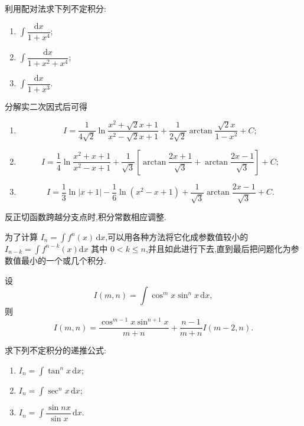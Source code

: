 \begin{example}
    利用配对法求下列不定积分:
    \begin{enumerate}
        \item $\displaystyle\int\dfrac{\mathrm{d}x}{1+x^4}$;
        \item $\displaystyle\int\dfrac{\mathrm{d}x}{1+x^2+x^4}$;
        \item $\displaystyle\int\dfrac{\mathrm{d}x}{1+x^3}$.
    \end{enumerate}
\end{example}
\exampleblank

\begin{solution}
    分解实二次因式后可得
    \begin{enumerate}
        \item
              \[
                  I=\dfrac{1}{4\sqrt2}\ln\dfrac{x^2+\sqrt2x+1}{x^2-\sqrt2x+1}
                  +\dfrac{1}{2\sqrt2}\arctan\dfrac{\sqrt2x}{1-x^2}+C;
              \]
        \item
              \[
                  I=\dfrac{1}{4}\ln\dfrac{x^2+x+1}{x^2-x+1}
                  +\dfrac{1}{\sqrt3}\left[
                      \arctan\dfrac{2x+1}{\sqrt3}
                      +\arctan\dfrac{2x-1}{\sqrt3}\right]+C;
              \]
        \item
              \[
                  I=\dfrac{1}{3}\ln|x+1|-\dfrac{1}{6}\ln(x^2-x+1)
                  +\dfrac{1}{\sqrt3}\arctan\dfrac{2x-1}{\sqrt3}+C.
              \]
    \end{enumerate}
    反正切函数跨越分支点时,积分常数相应调整.
\end{solution}




为了计算 $\displaystyle I_n=\int f^n(x)\,\mathrm{d}x$,可以用各种方法将它化成参数值较小的 $\displaystyle I_{n-k}=\int f^{n-k}(x)\mathrm{d}x$ 其中 $0<k\leq n$,并且如此进行下去,直到最后把问题化为参数值最小的一个或几个积分.

\begin{proposition}[\markstar]
    设
    \[
        I(m,n)=\int\cos^m x\sin^n x\,\mathrm{d}x,
    \]
    则
    \[
        I(m,n)
        =\dfrac{\cos^{m-1}x\sin^{n+1}x}{m+n}
        +\dfrac{n-1}{m+n}I(m-2,n).
    \]
\end{proposition}

\begin{example}
    求下列不定积分的递推公式:
    \begin{enumerate}
        \item $\displaystyle I_n=\int\tan^n x\,\mathrm{d}x$;
        \item $\displaystyle I_n=\int\sec^n x\,\mathrm{d}x$;
        \item $\displaystyle I_n=\int\dfrac{\sin nx}{\sin x}\,\mathrm{d}x$.
    \end{enumerate}
\end{example}
\exampleblank

